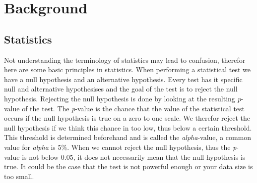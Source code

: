 \chapter{Background}
\label{ch:background}

\section{Statistics}
Not understanding the terminology of statistics may lead to confusion, therefor here are some basic principles in statistics. When performing a statistical test we have a null hypothesis and an alternative hypothesis. Every test has it specific null and alternative hypothesises and the goal of the test is to reject the null hypothesis. Rejecting the null hypothesis is done by looking at the resulting \textit{p}-value of the test. The \textit{p}-value is the chance that the value of the statistical test occurs if the null hypothesis is true on a zero to one scale. We therefor reject the null hypothesis if we think this chance in too low, thus below a certain threshold. This threshold is determined beforehand and is called the \textit{alpha}-value, a common value for  \textit{alpha} is 5\%. When we cannot reject the null hypothesis, thus the \textit{p}-value is not below $0.05$, it does not necessarily mean that the null hypothesis is true. It could be the case that the test is not powerful enough or your data size is too small.


